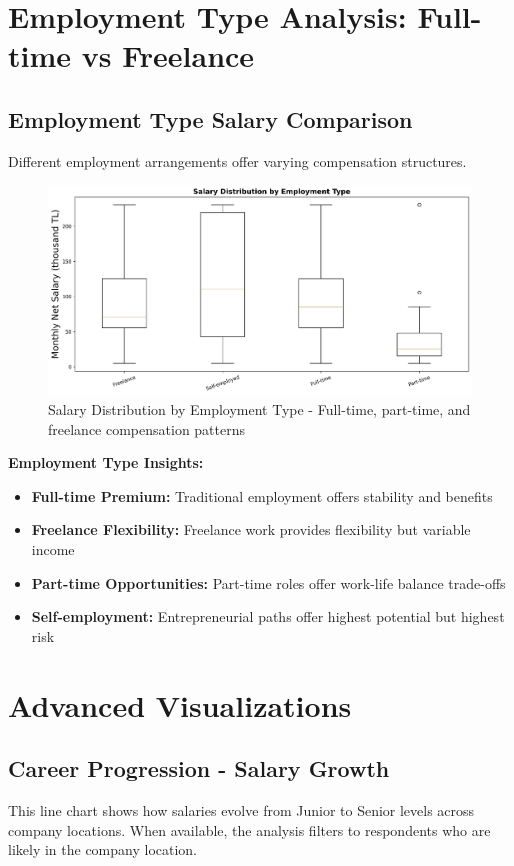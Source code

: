 \documentclass[12pt,a4paper]{article}
\begin{document}
\section{Employment Type Analysis: Full-time vs Freelance}

\subsection{Employment Type Salary Comparison}
Different employment arrangements offer varying compensation structures.

\begin{figure}[H]
    \centering
    \includegraphics[width=\textwidth]{figures/boxplot_employment_type.png}
    \caption{Salary Distribution by Employment Type - Full-time, part-time, and freelance compensation patterns}
\end{figure}

\textbf{Employment Type Insights:}
\begin{itemize}
    \item \textbf{Full-time Premium:} Traditional employment offers stability and benefits
    \item \textbf{Freelance Flexibility:} Freelance work provides flexibility but variable income
    \item \textbf{Part-time Opportunities:} Part-time roles offer work-life balance trade-offs
    \item \textbf{Self-employment:} Entrepreneurial paths offer highest potential but highest risk
\end{itemize}

\section{Advanced Visualizations}

\subsection{Career Progression - Salary Growth}
This line chart shows how salaries evolve from Junior to Senior levels across company locations. When available, the analysis filters to respondents who are likely in the company location.
\end{document}

